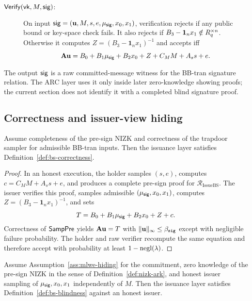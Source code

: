 \begin{description}
\item[\(\mathsf{Verify}(\mathsf{vk},M,\mathsf{sig})\):] On input \(\mathsf{sig}=(\mathbf{u},M,s,e,\mu_{\mathsf{sig}},x_0,x_1)\), verification rejects if any public
bound or key-space check fails.  It also rejects if \(B_3-\mathbf 1_nx_1\notin R_q^{\times n}\).  Otherwise it
computes \(Z=(B_3-\mathbf 1_nx_1)^{-1}\) and accepts iff
\[
  \mathbf{A}\mathbf{u}=B_0+B_1\mu_{\mathsf{sig}}+B_2x_0+Z+C_MM+A_s s+e.
\]
\end{description}

The output \(\mathsf{sig}\) is a raw committed-message witness for the BB-tran signature relation.  The ARC layer uses it
only inside later zero-knowledge showing proofs; the current section does not identify it with a completed blind
signature proof.

\subsection{Correctness and issuer-view hiding}
\begin{proposition}[Correctness]\label{prop:bs-correctness-prop}
Assume completeness of the pre-sign NIZK and correctness of the trapdoor sampler for admissible BB-tran inputs.
Then the issuance layer satisfies Definition~\ref{def:bs-correctness}.
\end{proposition}

\begin{proof}
In an honest execution, the holder samples \((s,e)\), computes \(c=C_MM+A_s s+e\), and produces a complete
pre-sign proof for \(\mathcal R_{\mathrm{IssueBS}}\).  The issuer verifies this proof, samples admissible
\((\mu_{\mathsf{sig}},x_0,x_1)\), computes \(Z=(B_3-\mathbf 1_nx_1)^{-1}\), and sets
\[
  T=B_0+B_1\mu_{\mathsf{sig}}+B_2x_0+Z+c.
\]
Correctness of \(\mathsf{SampPre}\) yields \(\mathbf{A}\mathbf{u}=T\) with \(\|\mathbf{u}\|_\infty\le\beta_{\mathtt{sig}}\) except with negligible
failure probability.  The holder and raw verifier recompute the same equation and therefore accept with probability
at least \(1-\mathrm{negl}(\lambda)\).
\end{proof}

\begin{proposition}\label{prop:bs-issuer-view-hiding}
Assume Assumption~\ref{ass:mlwe-hiding} for the commitment, zero knowledge of the pre-sign NIZK in the sense of
Definition~\ref{def:nizk-ark}, and honest issuer sampling of \(\mu_{\mathsf{sig}},x_0,x_1\) independently of \(M\).  Then the
issuance layer satisfies Definition~\ref{def:bs-blindness} against an honest issuer.
\end{proposition}

